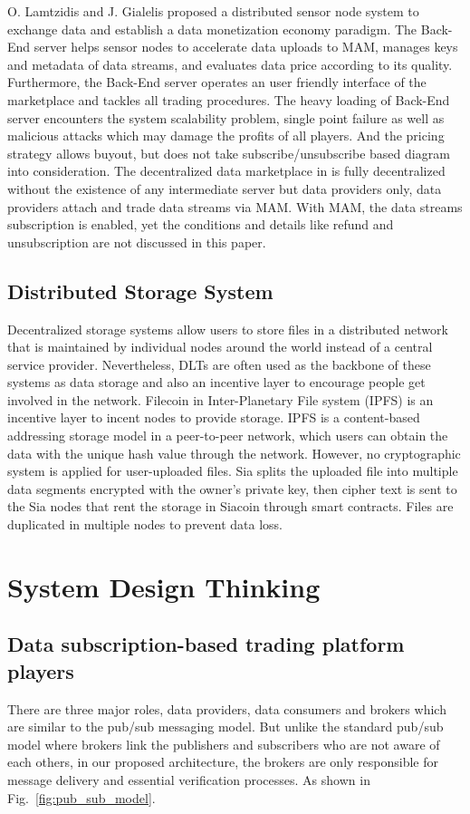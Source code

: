 \documentclass[conference]{IEEEtran}
\begin{document}
O. Lamtzidis and J. Gialelis \cite{IOTASensorNode} proposed a distributed sensor node system to exchange data and establish a data monetization economy paradigm. The Back-End server helps sensor nodes to accelerate data uploads to MAM, manages keys and metadata of data streams, and evaluates data price according to its quality. Furthermore, the Back-End server operates an user friendly interface of the marketplace and tackles all trading procedures. The heavy loading of Back-End server encounters the system scalability problem, single point failure as well as malicious attacks which may damage the profits of all players. And the pricing strategy allows buyout, but does not take subscribe/unsubscribe based diagram into consideration. The decentralized data marketplace in \cite{DDMSmartCities} is fully decentralized without the existence of any intermediate server but data providers only, data providers attach and trade data streams via MAM. With MAM, the data streams subscription is enabled, yet the conditions and details like refund and unsubscription are not discussed in this paper.
 
\subsection{Distributed Storage System}
Decentralized storage systems allow users to store files in a distributed network that is maintained by individual nodes around the world instead of a central service provider. Nevertheless, DLTs are often used as the backbone of these systems as data storage and also an incentive layer to encourage people get involved in the network. Filecoin \cite{FileCoin} in Inter-Planetary File system (IPFS) is an incentive layer to incent nodes to provide storage. IPFS is a content-based addressing storage model in a peer-to-peer network, which users can obtain the data with the unique hash value through the network. However, no cryptographic system is applied for user-uploaded files. Sia\cite{Sia} splits the uploaded file into multiple data segments encrypted with the owner's private key, then cipher text is sent to the Sia nodes that rent the storage in Siacoin through smart contracts. Files are duplicated in multiple nodes to prevent data loss.

\section{System Design Thinking}
\subsection{Data subscription-based trading platform players}
There are three major roles, data providers, data consumers and brokers which are similar to the pub/sub messaging model. But unlike the standard pub/sub model where brokers link the publishers and subscribers who are not aware of each others, in our proposed architecture, the brokers are only responsible for message delivery and essential verification processes. As shown in Fig.~\ref{fig:pub_sub_model}.
\end{document}
